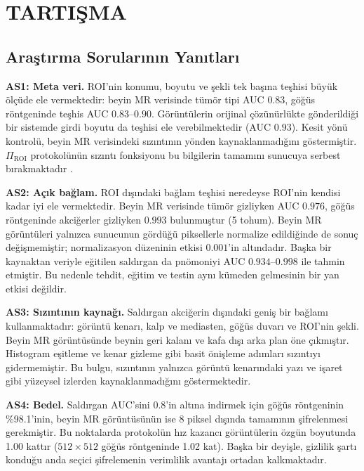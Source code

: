 \chapter{TARTIŞMA}\label{CH5}

\section{Araştırma Sorularının Yanıtları}\label{sec:yanitlar}

\textbf{AS1: Meta veri.} ROI'nin konumu, boyutu ve şekli tek başına teşhisi büyük ölçüde ele vermektedir: beyin MR verisinde tümör tipi AUC $0.83$, göğüs röntgeninde teşhis AUC $0.83$--$0.90$. Görüntülerin orijinal çözünürlükte gönderildiği bir sistemde girdi boyutu da teşhisi ele verebilmektedir (AUC $0.93$). Kesit yönü kontrolü, beyin MR verisindeki sızıntının yönden kaynaklanmadığını göstermiştir. $\Pi_{\mathrm{ROI}}$ protokolünün sızıntı fonksiyonu bu bilgilerin tamamını sunucuya serbest bırakmaktadır \cite{bakas2026roi}.

\textbf{AS2: Açık bağlam.} ROI dışındaki bağlam teşhisi neredeyse ROI'nin kendisi kadar iyi ele vermektedir. Beyin MR verisinde tümör gizliyken AUC $0.976$, göğüs röntgeninde akciğerler gizliyken $0.993$ bulunmuştur (5 tohum). Beyin MR görüntüleri yalnızca sunucunun gördüğü piksellerle normalize edildiğinde de sonuç değişmemiştir; normalizasyon düzeninin etkisi $0.001$'in altındadır. Başka bir kaynaktan veriyle eğitilen saldırgan da pnömoniyi AUC $0.934$--$0.998$ ile tahmin etmiştir. Bu nedenle tehdit, eğitim ve testin aynı kümeden gelmesinin bir yan etkisi değildir.

\textbf{AS3: Sızıntının kaynağı.} Saldırgan akciğerin dışındaki geniş bir bağlamı kullanmaktadır: görüntü kenarı, kalp ve mediasten, göğüs duvarı ve ROI'nin şekli. Beyin MR görüntüsünde beynin geri kalanı ve kafa dışı arka plan öne çıkmıştır. Histogram eşitleme ve kenar gizleme gibi basit önişleme adımları sızıntıyı gidermemiştir. Bu bulgu, sızıntının yalnızca görüntü kenarındaki yazı ve işaret gibi yüzeysel izlerden kaynaklanmadığını göstermektedir.

\textbf{AS4: Bedel.} Saldırgan AUC'sini $0.8$'in altına indirmek için göğüs röntgeninin \%98.1'inin, beyin MR görüntüsünün ise 8 piksel dışında tamamının şifrelenmesi gerekmiştir. Bu noktalarda protokolün hız kazancı görüntülerin özgün boyutunda 1.00 kattır ($512 \times 512$ göğüs röntgeninde 1.02 kat). Başka bir deyişle, gizlilik şartı konduğu anda seçici şifrelemenin verimlilik avantajı ortadan kalkmaktadır.

